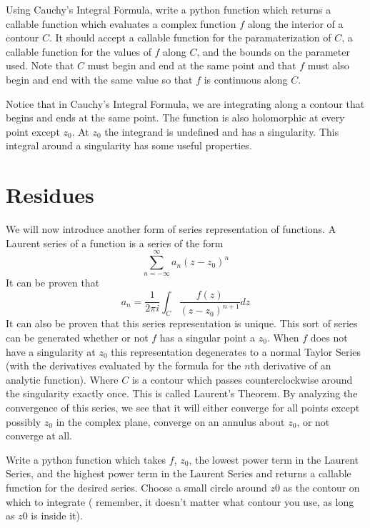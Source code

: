 \begin{problem}
Using Cauchy's Integral Formula, write a python function which returns a callable function which evaluates a complex function $f$ along the interior of a contour $C$. It should accept a callable function for the paramaterization of $C$, a callable function for the values of $f$ along $C$, and the bounds on the parameter used. Note that $C$ must begin and end at the same point and that $f$ must also begin and end with the same value so that $f$ is continuous along $C$.
\end{problem}

Notice that in Cauchy's Integral Formula, we are integrating along a contour that begins and ends at the same point.
The function is also holomorphic at every point except $z_0$. At $z_0$ the integrand is undefined and has a singularity.
This integral around a singularity has some useful properties.

\section*{Residues}

We will now introduce another form of series representation of functions.
A Laurent series of a function is a series of the form $$\sum_{n= -\infty}^{\infty} a_n (z-z_0)^n$$
It can be proven that 
$$a_n = \frac{1}{2\pi i} \int_C \frac{f(z)}{(z-z_0)^{n+1}} dz$$ 
It can also be proven that this series representation is unique.
This sort of series can be generated whether or not $f$ has a singular point a $z_0$.
When $f$ does not have a singularity at $z_0$ this representation degenerates to a normal Taylor Series (with the derivatives evaluated by the formula for the $n$th derivative of an analytic function).
Where $C$ is a contour which passes counterclockwise around the singularity exactly once.
This is called Laurent's Theorem.
By analyzing the convergence of this series, we see that it will either converge for all points except possibly $z_0$ in the complex plane, converge on an annulus about $z_0$, or not converge at all.

\begin{problem}
Write a python function which takes $f$, $z_0$, the lowest power term in the Laurent Series, and the highest power term in the Laurent Series and returns a callable function for the desired series. Choose a small circle around $z0$ as the contour on which to integrate ( remember, it doesn't matter what contour you use, as long as $z0$ is inside it).
\end{problem}

